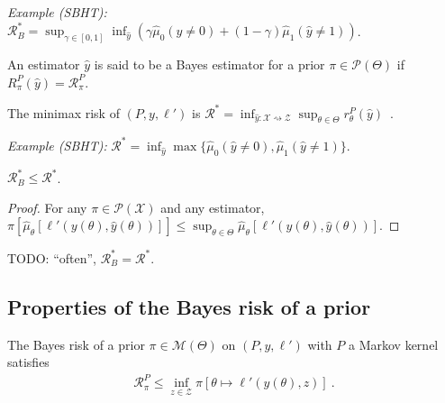 \emph{Example (SBHT):} $\mathcal R^*_B = \sup_{\gamma \in [0,1]}\inf_{\hat{y}}\left(\gamma \hat{\mu}_0(\hat{y} \ne 0) + (1 - \gamma) \hat{\mu}_1(\hat{y} \ne 1)\right)$.

\begin{definition}
  \label{def:bayesEstimator}
  \mathlibok
  An estimator $\hat{y}$ is said to be a Bayes estimator for a prior $\pi \in \mathcal P(\Theta)$ if $R^P_\pi(\hat{y}) = \mathcal R^P_\pi$.
\end{definition}

\begin{definition}
  \label{def:minimaxRisk}
  \mathlibok
  The minimax risk of $(P, y, \ell')$ is $\mathcal R^* = \inf_{\hat{y} : \mathcal X \rightsquigarrow \mathcal Z} \sup_{\theta \in \Theta} r^P_\theta(\hat{y})$~.
\end{definition}

\emph{Example (SBHT):} $\mathcal R^* = \inf_{\hat{y}} \max\{\hat{\mu}_0(\hat{y} \ne 0), \hat{\mu}_1(\hat{y} \ne 1)\}$.

\begin{lemma}
  \label{lem:bayesRisk_le_minimaxRisk}
  \mathlibok
  $\mathcal R_B^* \le \mathcal R^*$.
\end{lemma}

\begin{proof}\mathlibok
For any $\pi \in \mathcal P(\mathcal X)$ and any estimator, $\pi\left[\hat{\mu}_\theta\left[\ell'(y(\theta), \hat{y}(\theta))\right]\right] \le \sup_{\theta \in \Theta}\hat{\mu}_\theta\left[\ell'(y(\theta), \hat{y}(\theta))\right]$.
\end{proof}

TODO: ``often'', $\mathcal R^*_B = \mathcal R^*$.




\subsection{Properties of the Bayes risk of a prior}

\begin{lemma}
  \label{lem:bayesRisk_le_const}
  \mathlibok
  The Bayes risk of a prior $\pi \in \mathcal M(\Theta)$ on $(P, y, \ell')$ with $P$ a Markov kernel satisfies
  \begin{align*}
  \mathcal R^P_\pi \le \inf_{z \in \mathcal Z} \pi\left[ \theta \mapsto \ell'(y(\theta), z) \right]
  \: .
  \end{align*}
\end{lemma}

